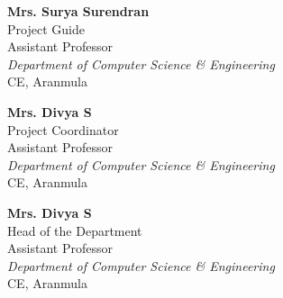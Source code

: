 \begin{titlepage}
  \begin{center}
    \begin{minipage}{0.32\linewidth}
      \begin{flushleft}
        \small
        \textbf{Mrs. Surya Surendran} \\
        Project Guide \\
        Assistant Professor \\
        \normalsize
        \textit{Department of Computer Science \& Engineering} \\
        CE, Aranmula
      \end{flushleft}
    \end{minipage}%
    \begin{minipage}{0.32\linewidth}
      \begin{center}
        \small
       \textbf{Mrs. Divya S} \\
       Project Coordinator \\
       Assistant Professor \\
       \normalsize
       \textit{Department of Computer Science \& Engineering} \\
      CE, Aranmula
      \end{center}
    \end{minipage}
\begin{minipage}{0.32\linewidth}
	\begin{flushright}
		\small
		\textbf{Mrs. Divya S} \\
		Head of the Department \\
		Assistant Professor \\
		\normalsize
		\textit{Department of Computer Science \& Engineering} \\
		CE, Aranmula
	\end{flushright}
\end{minipage}
  \end{center}

\end{titlepage}
